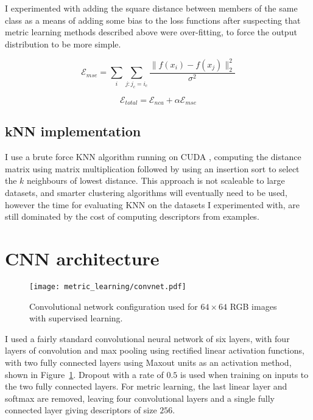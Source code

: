 I experimented with adding the square distance between members of the same class as a means of adding some bias to the loss functions after suspecting that metric learning methods described above were over-fitting, to force the output distribution to be more simple. 

\begin{equation}
\label{eqn:mse}
\mathcal{E}_{mse} = \sum_i{ \sum_{j:j_c = i_c}  \frac {{\lVert f(x_i) - f(x_j) \rVert^2_2}} {\sigma^2} }
\end{equation}

\begin{equation}
\label{eqn:mse_total}
\mathcal{E}_{total} =  \mathcal{E}_{nca} + \alpha \mathcal{E}_{mse}
\end{equation}


\subsection {kNN implementation}

I use a brute force \gls{KNN} algorithm running on CUDA \cite{Garcia2008}, computing the distance matrix using matrix multiplication followed by using an insertion sort to select the $ k $ neighbours of lowest distance. This approach is not scaleable to large datasets, and smarter clustering algorithms will eventually need to be used, however the time for evaluating \gls{KNN} on the datasets I experimented with, are still dominated by the cost of computing descriptors from examples. 


\section {CNN architecture}


\begin{figure}[ht]
\centering
\texttt{[image: metric\_learning/convnet.pdf]}
\caption{Convolutional network configuration used for $64\times64$ RGB images with supervised learning.}
\label{fig:metric_convnet}
\end{figure}

I used a fairly standard convolutional neural network of six layers, with four layers of convolution and max pooling using rectified linear activation functions, with two fully connected layers using Maxout \cite{Springenberg2013} units as an activation method, shown in Figure~\ref{fig:metric_convnet}. Dropout \cite{HintonDropout} with a rate of $ 0.5 $ is used when training on inputs to the two fully connected layers. For metric learning, the last linear layer and softmax are removed, leaving four convolutional layers and a single fully connected layer giving descriptors of size $ 256 $.

